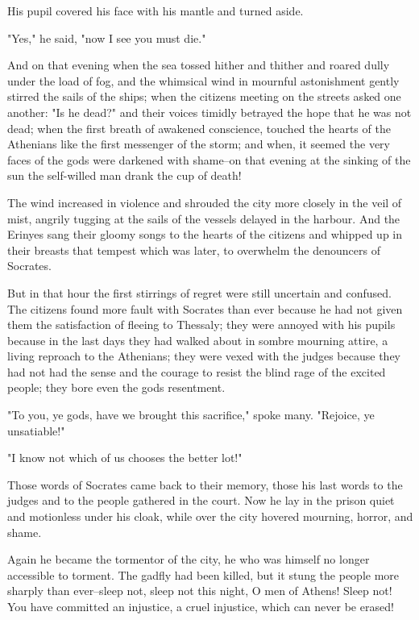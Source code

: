 His pupil covered his face with his mantle and turned aside.

"Yes," he said, "now I see you must die."

And on that evening when the sea tossed hither and thither and roared
dully under the load of fog, and the whimsical wind in mournful
astonishment gently stirred the sails of the ships; when the citizens
meeting on the streets asked one another: "Is he dead?" and their
voices timidly betrayed the hope that he was not dead; when the first
breath of awakened conscience, touched the hearts of the Athenians
like the first messenger of the storm; and when, it seemed the very
faces of the gods were darkened with shame--on that evening at the
sinking of the sun the self-willed man drank the cup of death!

The wind increased in violence and shrouded the city more closely in
the veil of mist, angrily tugging at the sails of the vessels delayed
in the harbour. And the Erinyes sang their gloomy songs to the hearts
of the citizens and whipped up in their breasts that tempest which was
later, to overwhelm the denouncers of Socrates.

But in that hour the first stirrings of regret were still uncertain
and confused. The citizens found more fault with Socrates than ever
because he had not given them the satisfaction of fleeing to Thessaly;
they were annoyed with his pupils because in the last days they had
walked about in sombre mourning attire, a living reproach to the
Athenians; they were vexed with the judges because they had not had
the sense and the courage to resist the blind rage of the excited
people; they bore even the gods resentment.

"To you, ye gods, have we brought this sacrifice," spoke many.
"Rejoice, ye unsatiable!"

"I know not which of us chooses the better lot!"

Those words of Socrates came back to their memory, those his last
words to the judges and to the people gathered in the court. Now he
lay in the prison quiet and motionless under his cloak, while over the
city hovered mourning, horror, and shame.

Again he became the tormentor of the city, he who was himself no
longer accessible to torment. The gadfly had been killed, but it stung
the people more sharply than ever--sleep not, sleep not this night, O
men of Athens! Sleep not! You have committed an injustice, a cruel
injustice, which can never be erased!



